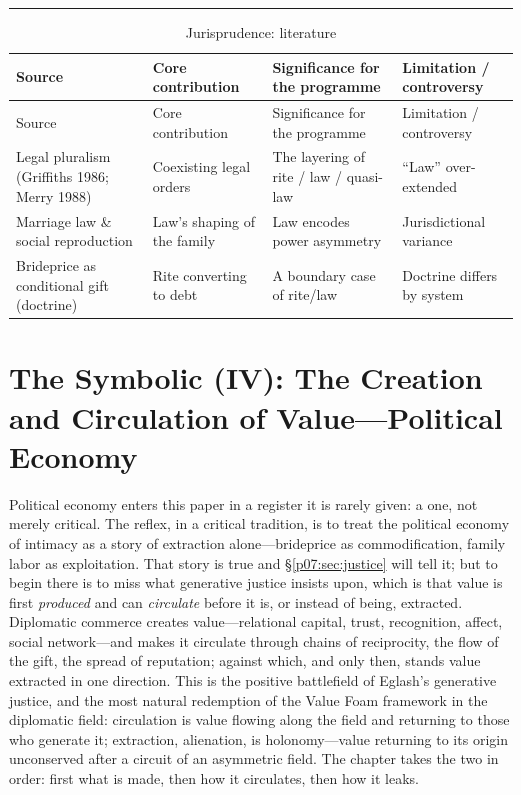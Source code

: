 \documentclass[11pt,a4paper]{article}
\newcommand{\emb}[1]{\textcolor{rose}{\oldtextbf{#1}}}
\newcommand{\goldrule}{\noindent\textcolor{gold}{\rule{\linewidth}{0.6pt}}\par\vspace{0.4em}}
\newcommand{\xref}[1]{\textcolor{rose}{\S\ref{#1}}}
\begin{document}
\goldrule
\footnotesize
\begin{longtable}{Y Y Y Y}
\caption{Jurisprudence: literature}\label{p07:tab:juris}\\
\toprule
{}
Source & Core contribution & Significance for the programme & Limitation / controversy \\
\midrule
\endfirsthead
\toprule
{}
Source & Core contribution & Significance for the programme & Limitation / controversy \\
\midrule
\endhead
Legal pluralism (Griffiths 1986; Merry 1988) & Coexisting legal orders & The layering of rite / law / quasi-law & ``Law'' over-extended \\
Marriage law \& social reproduction & Law's shaping of the family & Law encodes power asymmetry & Jurisdictional variance \\
Brideprice as conditional gift (doctrine) & Rite converting to debt & A boundary case of rite/law & Doctrine differs by system \\
\bottomrule
\end{longtable}

\section{The Symbolic (IV): The Creation and Circulation of Value---Political Economy}\label{p07:sec:polecon}

Political economy enters this paper in a register it is rarely given: a \emb{positive, constructive} one, not merely critical. The reflex, in a critical tradition, is to treat the political economy of intimacy as a story of extraction alone---brideprice as commodification, family labor as exploitation. That story is true and \xref{p07:sec:justice} will tell it; but to begin there is to miss what generative justice insists upon, which is that value is first \emph{produced} and can \emph{circulate} before it is, or instead of being, extracted. Diplomatic commerce creates value---relational capital, trust, recognition, affect, social network---and makes it circulate through chains of reciprocity, the flow of the gift, the spread of reputation; against which, and only then, stands value extracted in one direction. This is the positive battlefield of Eglash's generative justice, and the most natural redemption of the Value Foam framework in the diplomatic field: circulation is value flowing along the field and returning to those who generate it; extraction, alienation, is holonomy---value returning to its origin unconserved after a circuit of an asymmetric field. The chapter takes the two in order: first what is made, then how it circulates, then how it leaks.
\end{document}
